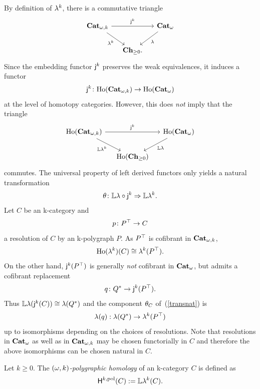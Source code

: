 \begin{paragr}\label{paragr:subtlety}
  By definition of $\mathsf{\mathsf{\lambda}}^{k}$, there is a commutative triangle
  \[
    \begin{tikzcd}[column sep=small]
      \opCat{k}\ar[rr,"\oemb{k}"]\ar[rd,"\abelk{k}"']&& \oCat\ar[dl,"\abel"] \\
      &\Chp.&
  \end{tikzcd}
\]
Since the embedding functor $\mathsf{j}_{}^{k}$ preserves the weak
equivalences, it induces a functor
\[\mathsf{j}_{}^{k}\colon \mathrm{Ho}(\mathbf{Cat}_{\omega,k})\to  \mathrm{Ho}(\mathbf{Cat}_{\omega})\]
at the level of homotopy categories. However, this does {\em not}
imply that the triangle
\[
  \begin{tikzcd}[column sep=small]
    \Loc{\opCat{k}}\ar[rr,"\oemb{k}"]\ar[rd,"\LL \abelk{k}"']&&
    \Loc{\oCat}\ar[dl,"\LL \abel"] \\
    &\Loc{\Chp}&
  \end{tikzcd}
\]
commutes. The universal property of left derived functors only yields a natural transformation
\begin{equation}\label{transnat}
  \theta\colon\mathbb{L} \mathsf{\lambda}\circ \mathsf{j}_{}^{k} \Rightarrow \mathbb{L} \mathsf{\mathsf{\lambda}}^{k}.
\end{equation}
Let $C$ be an \ook k-category and
\[
  p\colon P^\top\to C
\]
a resolution of $C$ by an \ook k-polygraph $P$. As $P^\top$ is
cofibrant in $\mathbf{Cat}_{\omega,k}$,
\[
  \mathrm{Ho}(\mathsf{\mathsf{\lambda}}^{k})(C)\cong \mathsf{\mathsf{\lambda}}^{k}(P^\top).
  \]
On
the other hand, $\mathsf{j}_{}^{k}(P^\top)$ is generally {\em not} cofibrant
in $\mathbf{Cat}_{\omega}$, but admits a cofibrant replacement
\[q\colon Q^*\to \mathsf{j}_{}^{k}(P^\top).\]
Thus $\mathbb{L}\mathsf{\lambda}(\mathsf{j}_{}^{k}(C))\cong \mathsf{\lambda}(Q^*)$ and the component
$\theta_C$ of~(\ref{transnat}) is
\[\mathsf{\lambda}(q):\mathsf{\lambda}(Q^*)\to \mathsf{\mathsf{\lambda}}^{k}(P^\top)\]
up to isomorphisms depending on the choices of resolutions. Note that
resolutions in $\mathbf{Cat}_{\omega}$ as well as in $\mathbf{Cat}_{\omega,k}$ may be chosen
functorially in $C$ and therefore the above isomorphisms can be chosen
natural in $C$. 
\end{paragr}
\begin{definition}\label{def:hompol}
  Let $k\geq 0$. The \emph{$(\omega,k)$\nbd-polygraphic homology} of
  an \ook k\nbd-category $C$ is defined as
  \[
    \mathsf{H}^{k,\mathrm{pol}}(C):=\mathbb{L} \mathsf{\mathsf{\lambda}}^{k} (C).
  \]
\end{definition}

